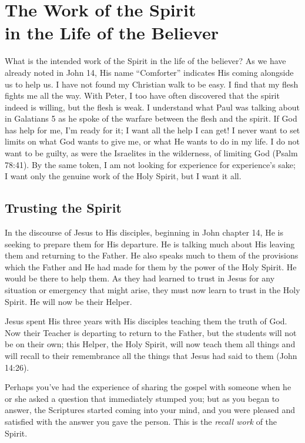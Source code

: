 \chapter[The Work of the Spirit in the Life of the Believer]{The Work of the Spirit\\ in the Life of the Believer}

What is the intended work of the Spirit in the life of the
believer? As we have already noted in John 14, His name
“Comforter” indicates His coming alongside us to help us.
I have not found my Christian walk to be easy. I find that
my flesh fights me all the way. With Peter, I too have often
discovered that the spirit indeed is willing, but the flesh is
weak. I understand what Paul was talking about in Galatians
5 as he spoke of the warfare between the flesh and the
spirit. If God has help for me, I’m ready for it; I want all the
help I can get! I never want to set limits on what God wants
to give me, or what He wants to do in my life. I do not want
to be guilty, as were the Israelites in the wilderness, of limiting
God (Psalm 78:41). By the same token, I am not looking
for experience for experience’s sake; I want only the genuine
work of the Holy Spirit, but I want it all.


\section*{Trusting the Spirit}

In the discourse of Jesus to His disciples, beginning in
John chapter 14, He is seeking to prepare them for His
departure. He is talking much about His leaving them and
returning to the Father. He also speaks much to them of the
provisions which the Father and He had made for them by
the power of the Holy Spirit. He would be there to help
them. As they had learned to trust in Jesus for any situation
or emergency that might arise, they must now learn to trust
in the Holy Spirit. He will now be their Helper.

Jesus spent His three years with His disciples teaching
them the truth of God. Now their Teacher is departing to
return to the Father, but the students will not be on their
own; this Helper, the Holy Spirit, will now teach them all
things and will recall to their remembrance all the things
that Jesus had said to them (John 14:26).

Perhaps you’ve had the experience of sharing the gospel
with someone when he or she asked a question that immediately
stumped you; but as you began to answer, the Scriptures
started coming into your mind, and you were pleased
and satisfied with the answer you gave the person. This is
the \emph{recall work} of the Spirit.

